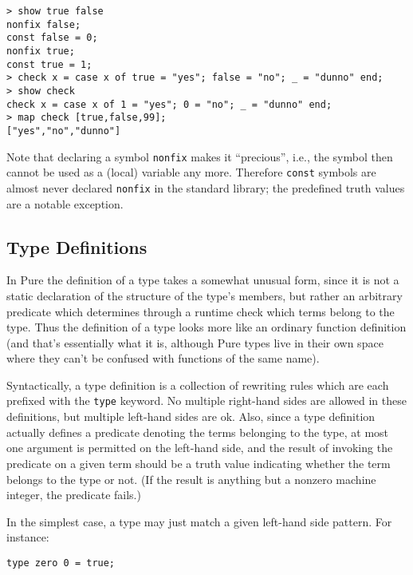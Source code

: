 \documentclass[a4paper,12pt]{article}
\begin{document}
\begin{lstlisting}
> show true false
nonfix false;
const false = 0;
nonfix true;
const true = 1;
> check x = case x of true = "yes"; false = "no"; _ = "dunno" end;
> show check
check x = case x of 1 = "yes"; 0 = "no"; _ = "dunno" end;
> map check [true,false,99];
["yes","no","dunno"]
\end{lstlisting}

Note that declaring a symbol \lstinline{nonfix} makes it ``precious'', i.e., the symbol then cannot be used as a (local) variable any more. Therefore \lstinline{const} symbols are almost never declared \lstinline{nonfix} in the standard library; the predefined truth values are a notable exception.

\subsection{Type Definitions}
\label{Type Definitions}

In Pure the definition of a type takes a somewhat unusual form, since it is not a static declaration of the structure of the type's members, but rather an arbitrary predicate which determines through a runtime check which terms belong to the type. Thus the definition of a type looks more like an ordinary function definition (and that's essentially what it is, although Pure types live in their own space where they can't be confused with functions of the same name).

Syntactically, a type definition is a collection of rewriting rules which are each prefixed with the \verb|type| keyword. No multiple right-hand sides are allowed in these definitions, but multiple left-hand sides are ok. Also, since a type definition actually defines a predicate denoting the terms belonging to the type, at most one argument is permitted on the left-hand side, and the result of invoking the predicate on a given term should be a truth value indicating whether the term belongs to the type or not. (If the result is anything but a nonzero machine integer, the predicate fails.)

In the simplest case, a type may just match a given left-hand side pattern. For instance:

\begin{lstlisting}
type zero 0 = true;
\end{lstlisting}
\end{document}
